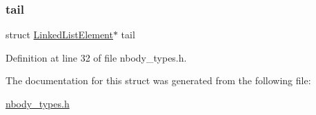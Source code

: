 \subsubsection{\texorpdfstring{tail}{tail}}
{\footnotesize\ttfamily struct \hyperlink{struct_linked_list_element}{Linked\+List\+Element}$\ast$ tail}



Definition at line 32 of file nbody\+\_\+types.\+h.



The documentation for this struct was generated from the following file\+:\begin{DoxyCompactItemize}
\item 
\hyperlink{nbody__types_8h}{nbody\+\_\+types.\+h}\end{DoxyCompactItemize}
